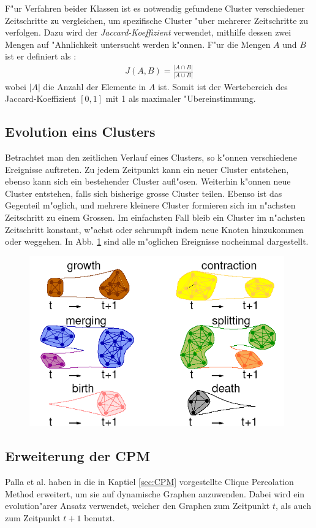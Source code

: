 \documentclass[journal]{vgtc}
\begin{document}
  F"ur Verfahren beider Klassen ist es notwendig gefundene Cluster verschiedener Zeitschritte zu vergleichen, um spezifische Cluster "uber
  mehrerer Zeitschritte zu verfolgen. Dazu wird der \emph{Jaccard-Koeffizient} verwendet, mithilfe dessen zwei Mengen auf "Ahnlichkeit
  untersucht werden k"onnen. F"ur die Mengen $A$ und $B$ ist er definiert als \cite{timestep}:
  \begin{align}
    J(A,B)=\frac{|A \cap B|}{|A \cup B|}
  \end{align}
  wobei $|A|$ die Anzahl der Elemente in $A$ ist. Somit ist der Wertebereich des Jaccard-Koeffizient $[0,1]$ mit 1 als maximaler "Ubereinstimmung.
  
  \subsection{Evolution eins Clusters}
    Betrachtet man den zeitlichen Verlauf eines Clusters, so k"onnen verschiedene Ereignisse auftreten. Zu jedem Zeitpunkt kann ein neuer Cluster
    entstehen, ebenso kann sich ein bestehender Cluster aufl"osen. Weiterhin k"onnen neue Cluster entstehen, falls sich bisherige grosse Cluster
    teilen. Ebenso ist das Gegenteil m"oglich, und mehrere kleinere Cluster formieren sich im n"achsten Zeitschritt zu einem Grossen.
    Im einfachsten Fall bleib ein Cluster im n"achsten Zeitschritt konstant, w"achst oder schrumpft indem neue Knoten hinzukommen oder weggehen.
    In Abb. \ref{fig:evolution} sind alle m"oglichen Ereignisse nocheinmal dargestellt.
    \begin{figure}[t]
      \centering
      \includegraphics[width=11cm]{images/evolution_alone}
      \caption{\cite{CPM_time}}
      \label{fig:evolution}
    \end{figure}
  \subsection{Erweiterung der CPM}
    \label{sec:CPM_time}
    Palla et al. haben in \cite{CPM_time} die in Kaptiel \ref{sec:CPM} vorgestellte Clique Percolation Method erweitert, um sie auf dynamische
    Graphen anzuwenden. Dabei wird ein evolution"arer Ansatz verwendet, welcher den Graphen zum Zeitpunkt $t$, als auch zum Zeitpunkt $t+1$
    benutzt.
    
\end{document}

